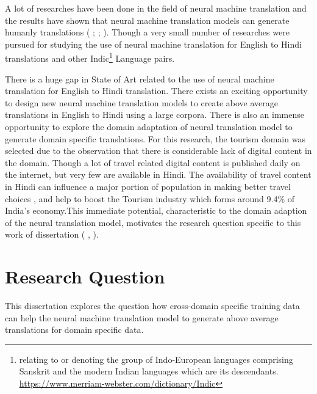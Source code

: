A lot of researches have been done in the field of neural machine translation and the results have shown that neural machine translation models can generate humanly translations ( \citeauthor{NIPS2014_5346} \citeyear{NIPS2014_5346}; \citeauthor{DBLP:journals/corr/BahdanauCB14} \citeyear{DBLP:journals/corr/BahdanauCB14}; \citeauthor{45610} \citeyear{45610}). Though a very small number of researches were pursued for studying the use of neural machine translation for English to Hindi translations and other Indic\footnote{relating to or denoting the group of Indo-European languages comprising Sanskrit and the modern Indian languages which are its descendants. {\url{https://www.merriam-webster.com/dictionary/Indic}}} Language pairs. 

There is a huge gap in State of Art related to the use of neural machine translation for English to Hindi translation. There exists an exciting opportunity to design new neural machine translation models to create above average translations in English to Hindi using a large corpora. There is also an immense opportunity to explore the domain adaptation of neural translation model to generate domain specific translations. For this research, the tourism domain was selected due to the observation that there is considerable lack of digital content in the domain. Though a lot of travel related digital content is published daily on the internet, but very few are available in Hindi. The availability of travel content in Hindi can influence a major portion of population in making better travel choices , and help to boost the Tourism industry which forms around 9.4\% of India's economy.This immediate potential, characteristic to the domain adaption of the neural translation model, motivates the research question specific to this work of dissertation (\citeauthor{wiki:tourism} , \citeyear{wiki:tourism}).

\section{Research Question}
This dissertation explores the question how cross-domain specific training data can help the  neural machine translation model to generate above average translations for domain specific data.


